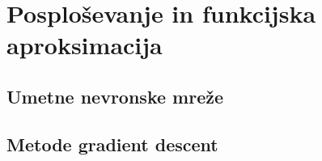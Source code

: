 \documentclass[a4paper, oneside, 12pt]{report}
\begin{document}

\chapter{Posploševanje in funkcijska aproksimacija}
\thispagestyle{fancy}
\section{Umetne nevronske mreže} %
\section{Metode gradient descent}
\end{document}
